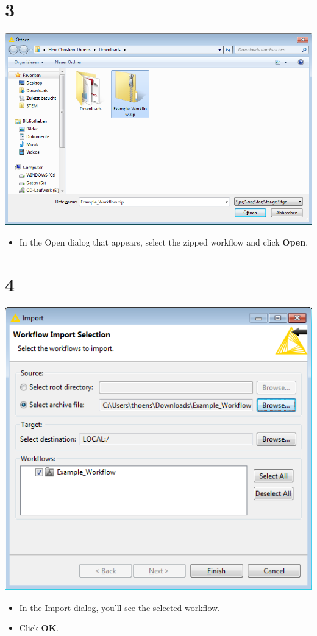 \documentclass{beamer}
\begin{document}
\section{3}
\begin{frame}
	\begin{center}
  		\includegraphics[height=0.6\textheight]{3.png}
	\end{center}
	\begin{itemize}
		\item In the Open dialog that appears, select the zipped workflow and click \textbf{Open}.
	\end{itemize}
\end{frame}

\section{4}
\begin{frame}
	\begin{center}
  		\includegraphics[height=0.7\textwidth]{4.png}
	\end{center}
	\begin{itemize}
		\item In the Import dialog, you'll see the selected workflow.
		\item Click \textbf{OK}.
	\end{itemize}
\end{frame}
\end{document}
